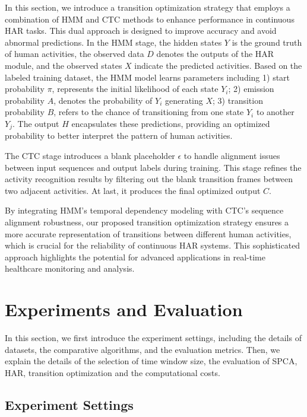 In this section, we introduce a transition optimization strategy that employs a combination of HMM and CTC methods to enhance performance in continuous HAR tasks. This dual approach is designed to improve accuracy and avoid abnormal predictions.
In the HMM stage, the hidden states $Y$ is the ground truth of human activities, the observed data $D$ denotes the outputs of the HAR module, and the observed states $X$ indicate the predicted activities. 
Based on the labeled training dataset, the HMM model learns parameters including 1) start probability $\pi$, represents the initial likelihood of each state $Y_i$; 2) emission probability $A$, denotes the probability of $Y_i$ generating $X$; 3) transition probability $B$, refers to the chance of transitioning from one state $Y_i$ to another $Y_j$. 
The output $H$ encapsulates these predictions, providing an optimized probability to better interpret the pattern of human activities.

The CTC stage introduces a blank placeholder $\epsilon$ to handle alignment issues between input sequences and output labels during training. This stage refines the activity recognition results by filtering out the blank transition frames between two adjacent activities. At last, it produces the final optimized output $C$.

By integrating HMM’s temporal dependency modeling with CTC’s sequence alignment robustness, our proposed transition optimization strategy ensures a more accurate representation of transitions between different human activities, which is crucial for the reliability of continuous HAR systems. This sophisticated approach highlights the potential for advanced applications in real-time healthcare monitoring and analysis.


\section{Experiments and Evaluation}
\label{sec: results}
In this section, we first introduce the experiment settings, including the details of datasets, the comparative algorithms, and the evaluation metrics. Then, we explain the details of the selection of time window size, the evaluation of SPCA, HAR, transition optimization and the computational costs. 




\subsection{Experiment Settings}
